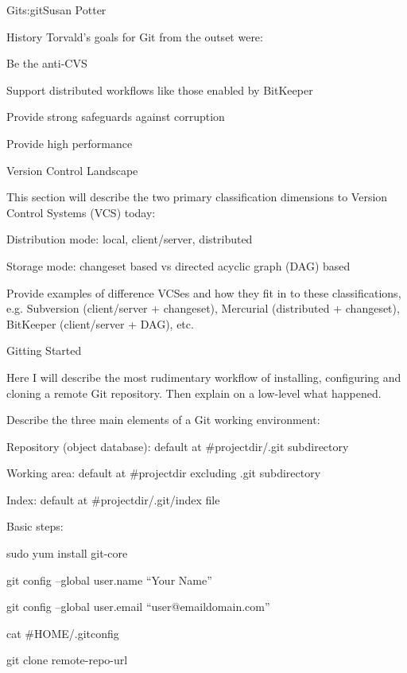 \begin{aosachapter}{Git}{s:git}{Susan Potter}
\begin{aosasect1}{History}
Torvald's goals for Git from the outset were:
\begin{aosaitemize}
  \item Be the anti-CVS
  \item Support distributed workflows like those enabled by BitKeeper
  \item Provide strong safeguards against corruption
  \item Provide high performance
\end{aosaitemize}

\begin{aosasect1}{Version Control Landscape}

This section will describe the two primary classification dimensions to 
Version Control Systems (VCS) today:

\begin{aosaitemize}
  \item Distribution mode: local, client/server, distributed
  \item Storage mode: changeset based vs directed acyclic graph (DAG) based
\end{aosaitemize}

Provide examples of difference VCSes and how they fit in to these 
classifications, e.g. Subversion (client/server + changeset), Mercurial 
(distributed + changeset), BitKeeper (client/server + DAG), etc.

\end{aosasect1}

\begin{aosasect1}{Gitting Started}

Here I will describe the most rudimentary workflow of installing, configuring 
and cloning a remote Git repository. Then explain on a low-level what happened.

Describe the three main elements of a Git working environment:
\begin{aosaitemize}
  \item Repository (object database): default at #{projectdir}/.git subdirectory
  \item Working area: default at #{projectdir} excluding .git subdirectory
  \item Index: default at #{projectdir}/.git/index file
\end{aosaitemize}

Basic steps:
\begin{aosaitemize}
  \item sudo yum install git-core
  \item git config --global user.name ``Your Name''
  \item git config --global user.email ``user@emaildomain.com''
  \item cat #{HOME}/.gitconfig
  \item git clone remote-repo-url
\end{aosaitemize}


\end{aosasect1}
\end{aosasect1}
\end{aosachapter}
